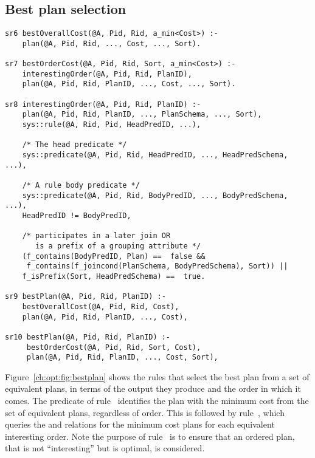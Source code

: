 \subsection{Best plan selection}
\label{ch:opt:sec:bestplan}

\begin{figure*}
\ssp
\centering
\begin{lstlisting}
sr6 bestOverallCost(@A, Pid, Rid, a_min<Cost>) :-
    plan(@A, Pid, Rid, ..., Cost, ..., Sort).

sr7 bestOrderCost(@A, Pid, Rid, Sort, a_min<Cost>) :-
    interestingOrder(@A, Pid, Rid, PlanID),
    plan(@A, Pid, Rid, PlanID, ..., Cost, ..., Sort).

sr8 interestingOrder(@A, Pid, Rid, PlanID) :-
    plan(@A, Pid, Rid, PlanID, ..., PlanSchema, ..., Sort),
    sys::rule(@A, Rid, Pid, HeadPredID, ...),

    /* The head predicate */
    sys::predicate(@A, Pid, Rid, HeadPredID, ..., HeadPredSchema, ...),

    /* A rule body predicate */
    sys::predicate(@A, Pid, Rid, BodyPredID, ..., BodyPredSchema, ...),
    HeadPredID != BodyPredID,

    /* participates in a later join OR 
       is a prefix of a grouping attribute */
    (f_contains(BodyPredID, Plan) ==  false && 
     f_contains(f_joincond(PlanSchema, BodyPredSchema), Sort)) ||
    f_isPrefix(Sort, HeadPredSchema) ==  true.

sr9 bestPlan(@A, Pid, Rid, PlanID) :-
    bestOverallCost(@A, Pid, Rid, Cost),
    plan(@A, Pid, Rid, PlanID, ..., Cost),

sr10 bestPlan(@A, Pid, Rid, PlanID) :-
     bestOrderCost(@A, Pid, Rid, Sort, Cost),
     plan(@A, Pid, Rid, PlanID, ..., Cost, Sort),
\end{lstlisting}
\caption{\label{ch:opt:fig:bestplan}Best plan selection.}
\end{figure*}

Figure~\ref{ch:opt:fig:bestplan} shows the rules that select the best plan from
a set of equivalent plans, in terms of the output they produce and the order in
which it comes.  The  predicate of rule~ identifies
the plan with the minimum cost from the set of equivalent plans, regardless of
order.  This is followed by rule~, which queries the  and
 relations for the minimum cost plans for each equivalent
interesting order.  Note the purpose of rule~ is to ensure that an
ordered plan, that is not ``interesting'' but is optimal, is considered.


